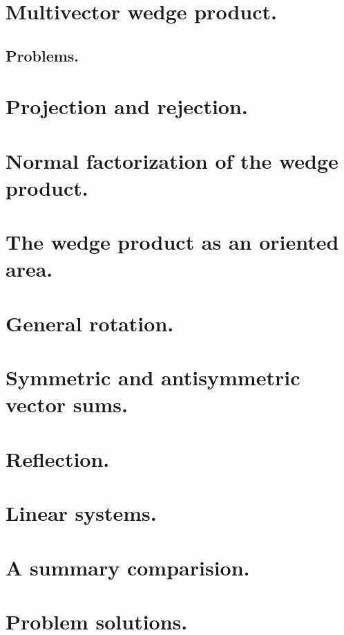    \section{Multivector wedge product.}
      
      \subsection{Problems.}
         
         
   \section{Projection and rejection.}
      
   \section{Normal factorization of the wedge product.}
      
   \section{The wedge product as an oriented area.}
      
   \section{General rotation.}
      
   \section{Symmetric and antisymmetric vector sums.}
      
   \section{Reflection.}
      
   \section{Linear systems.}
      
   \section{A summary comparision.}
      
   \section{Problem solutions.}
      \shipoutAnswer
